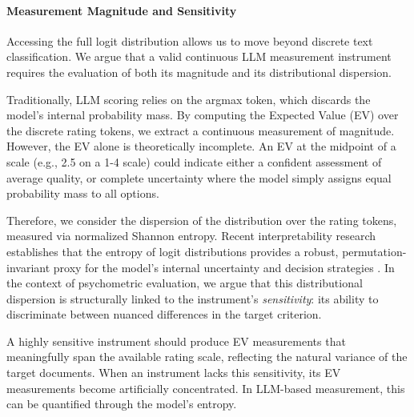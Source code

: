 




\paragraph{Measurement Magnitude and Sensitivity}\label{sec:theor_sensitivity}

Accessing the full logit distribution allows us to move beyond discrete text classification. We argue that a valid continuous LLM measurement instrument requires the evaluation of both its magnitude and its distributional dispersion. 

Traditionally, LLM scoring relies on the argmax token, which discards the model's internal probability mass. By computing the Expected Value (EV) over the discrete rating tokens, we extract a continuous measurement of magnitude. However, the EV alone is theoretically incomplete. An EV at the midpoint of a scale (e.g., 2.5 on a 1-4 scale) could indicate either a confident assessment of average quality, or complete uncertainty where the model simply assigns equal probability mass to all options.

Therefore, we consider the dispersion of the distribution over the rating tokens, measured via normalized Shannon entropy. Recent interpretability research establishes that the entropy of logit distributions provides a robust, permutation-invariant proxy for the model's internal uncertainty and decision strategies \citep{ali_entropy-lens_2025}. In the context of psychometric evaluation, we argue that this distributional dispersion is structurally linked to the instrument's \textit{sensitivity}: its ability to discriminate between nuanced differences in the target criterion. 

A highly sensitive instrument should produce EV measurements that meaningfully span the available rating scale, reflecting the natural variance of the target documents. When an instrument lacks this sensitivity, its EV measurements become artificially concentrated. In LLM-based measurement, this can be quantified through the model's entropy.


